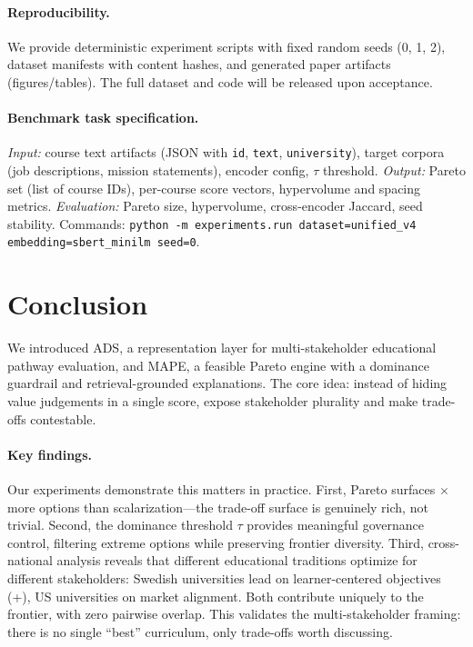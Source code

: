 \documentclass[sigconf,review]{acmart}
\newcommand{\ADS}{\textsc{ADS}\xspace}
\newcommand{\MAPE}{\textsc{MAPE}\xspace}
\begin{document}
\paragraph{Reproducibility.}
We provide deterministic experiment scripts with fixed random seeds (0, 1, 2), dataset manifests with content hashes, and generated paper artifacts (figures/tables). The full dataset and code will be released upon acceptance.

\paragraph{Benchmark task specification.}
\textit{Input:} course text artifacts (JSON with \texttt{id}, \texttt{text}, \texttt{university}), target corpora (job descriptions, mission statements), encoder config, $\tau$ threshold.
\textit{Output:} Pareto set (list of course IDs), per-course score vectors, hypervolume and spacing metrics.
\textit{Evaluation:} Pareto size, hypervolume, cross-encoder Jaccard, seed stability.
Commands: \texttt{python -m experiments.run dataset=unified\_v4 embedding=sbert\_minilm seed=0}.


\section{Conclusion}

We introduced \ADS, a representation layer for multi-stakeholder educational pathway evaluation, and \MAPE, a feasible Pareto engine with a dominance guardrail and retrieval-grounded explanations. The core idea: instead of hiding value judgements in a single score, expose stakeholder plurality and make trade-offs contestable.

\paragraph{Key findings.}
Our experiments demonstrate this matters in practice. First, Pareto surfaces {\ParetoVsBaselineRatio}$\times$ more options than scalarization---the trade-off surface is genuinely rich, not trivial. Second, the dominance threshold $\tau$ provides meaningful governance control, filtering extreme options while preserving frontier diversity. Third, cross-national analysis reveals that different educational traditions optimize for different stakeholders: Swedish universities lead on learner-centered objectives (+{\LearnerGapPercent}), US universities on market alignment. Both contribute uniquely to the frontier, with zero pairwise overlap. This validates the multi-stakeholder framing: there is no single ``best'' curriculum, only trade-offs worth discussing.
\end{document}

